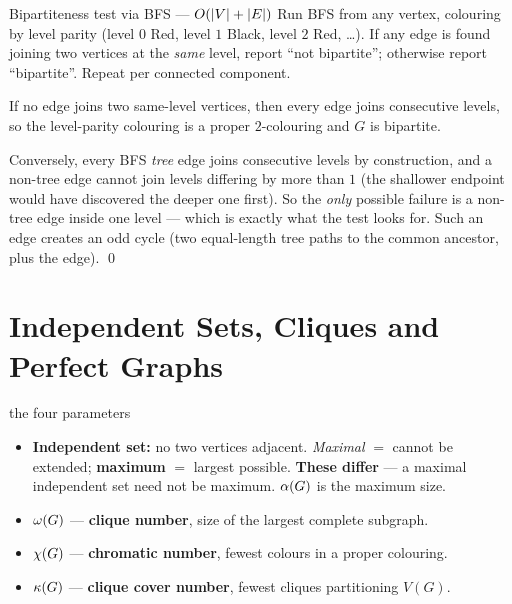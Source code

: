 \begin{algo}{Bipartiteness test via BFS --- $O(|V|+|E|)$}
Run BFS from any vertex, colouring by level parity (level $0$ Red, level $1$ Black, level $2$
Red, \dots). If any edge is found joining two vertices at the \emph{same} level, report ``not
bipartite''; otherwise report ``bipartite''. Repeat per connected component.
\end{algo}

\begin{correct}
If no edge joins two same-level vertices, then every edge joins consecutive levels, so the
level-parity colouring is a proper $2$-colouring and $G$ is bipartite.

Conversely, every BFS \emph{tree} edge joins consecutive levels by construction, and a non-tree
edge cannot join levels differing by more than $1$ (the shallower endpoint would have discovered
the deeper one first). So the \emph{only} possible failure is a non-tree edge inside one level ---
which is exactly what the test looks for. Such an edge creates an odd cycle (two equal-length
tree paths to the common ancestor, plus the edge). \qed
\end{correct}

\section{Independent Sets, Cliques and Perfect Graphs}

\begin{facts}{the four parameters}
\begin{itemize}
  \item \textbf{Independent set:} no two vertices adjacent. \emph{Maximal} $=$ cannot be
        extended; \textbf{maximum} $=$ largest possible. \textbf{These differ} --- a maximal
        independent set need not be maximum. $\alpha(G)$ is the maximum size.
  \item $\omega(G)$ --- \textbf{clique number}, size of the largest complete subgraph.
  \item $\chi(G)$ --- \textbf{chromatic number}, fewest colours in a proper colouring.
  \item $\kappa(G)$ --- \textbf{clique cover number}, fewest cliques partitioning $V(G)$.
\end{itemize}
\end{facts}

